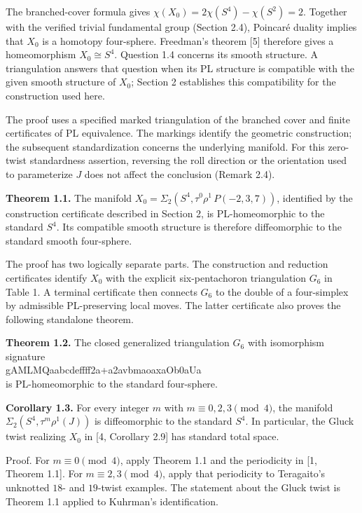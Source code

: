 \documentclass[11pt,letterpaper]{article}
\begin{document}
The branched-cover formula gives $\chi(X_0)=2\chi(S^4)-\chi(S^2)=2$. Together with the verified trivial fundamental group (Section 2.4), Poincaré duality implies that $X_0$ is a homotopy four-sphere. Freedman's theorem [5] therefore gives a homeomorphism $X_0\cong S^4$. Question 1.4 concerns its smooth structure. A triangulation answers that question when its PL structure is compatible with the given smooth structure of $X_0$; Section 2 establishes this compatibility for the construction used here.

The proof uses a specified marked triangulation of the branched cover and finite certificates of PL equivalence. The markings identify the geometric construction; the subsequent standardization concerns the underlying manifold. For this zero-twist standardness assertion, reversing the roll direction or the orientation used to parameterize $J$ does not affect the conclusion (Remark 2.4).

\medskip\noindent\textbf{Theorem 1.1.} The manifold $X_0=\Sigma_2(S^4,\tau^0\rho^1\,P(-2,3,7))$, identified by the construction certificate described in Section 2, is PL-homeomorphic to the standard $S^4$. Its compatible smooth structure is therefore diffeomorphic to the standard smooth four-sphere.

The proof has two logically separate parts. The construction and reduction certificates identify $X_0$ with the explicit six-pentachoron triangulation $G_6$ in Table 1. A terminal certificate then connects $G_6$ to the double of a four-simplex by admissible PL-preserving local moves. The latter certificate also proves the following standalone theorem.

\medskip\noindent\textbf{Theorem 1.2.} The closed generalized triangulation $G_6$ with isomorphism signature \hfil\\\mbox{\small\ttfamily gAMLMQaabcdeffff2a+a2avbmaoaxaOb0aUa}\hfil\\ is PL-homeomorphic to the standard four-sphere.

\medskip\noindent\textbf{Corollary 1.3.} For every integer $m$ with $m\equiv0,2,3\pmod4$, the manifold $\Sigma_2(S^4,\tau^m\rho^1(J))$ is diffeomorphic to the standard $S^4$. In particular, the Gluck twist realizing $X_0$ in [4, Corollary 2.9] has standard total space.

Proof. For $m\equiv0\pmod4$, apply Theorem 1.1 and the periodicity in [1, Theorem 1.1]. For $m\equiv2,3\pmod4$, apply that periodicity to Teragaito's unknotted $18$- and $19$-twist examples. The statement about the Gluck twist is Theorem 1.1 applied to Kuhrman's identification.
\end{document}
